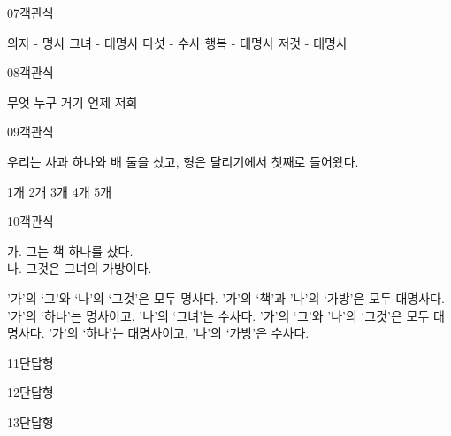 \documentclass[fs85,seriesRus]{korfarm-base}
\begin{document}
\begin{kfQBlock}{07}{객관식}
\begin{kfChoices}
\kfChoice 의자 - 명사
\kfChoice 그녀 - 대명사
\kfChoice 다섯 - 수사
\kfChoice 행복 - 대명사
\kfChoice 저것 - 대명사
\end{kfChoices}
\end{kfQBlock}
\begin{kfQBlock}{08}{객관식}
\begin{kfChoices}
\kfChoice 무엇
\kfChoice 누구
\kfChoice 거기
\kfChoice 언제
\kfChoice 저희
\end{kfChoices}
\end{kfQBlock}
\begin{kfQBlock}{09}{객관식}
\begin{kfEvidence}우리는 사과 하나와 배 둘을 샀고, 형은 달리기에서 첫째로 들어왔다.\end{kfEvidence}
\begin{kfChoices}
\kfChoice 1개
\kfChoice 2개
\kfChoice 3개
\kfChoice 4개
\kfChoice 5개
\end{kfChoices}
\end{kfQBlock}
\begin{kfQBlock}{10}{객관식}
\begin{kfEvidence}가. 그는 책 하나를 샀다. \\\relax
나. 그것은 그녀의 가방이다.\end{kfEvidence}
\begin{kfChoices}
\kfChoice '가'의 ‘그’와 ‘나'의 ‘그것’은 모두 명사다.
\kfChoice '가'의 ‘책’과 '나'의 ‘가방’은 모두 대명사다.
\kfChoice '가'의 ‘하나’는 명사이고, '나'의 ‘그녀’는 수사다.
\kfChoice '가'의 ‘그’와 '나'의 ‘그것’은 모두 대명사다.
\kfChoice '가'의 ‘하나’는 대명사이고, '나'의 ‘가방’은 수사다.
\end{kfChoices}
\end{kfQBlock}
\begin{kfQBlock}{11}{단답형}
\end{kfQBlock}
\begin{kfQBlock}{12}{단답형}
\end{kfQBlock}
\begin{kfQBlock}{13}{단답형}
\end{kfQBlock}
\end{document}
